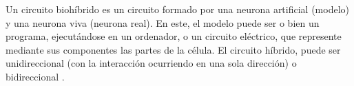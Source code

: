 Un circuito biohíbrido es un circuito formado por una neurona artificial (modelo) y una neurona viva (neurona real). En este, el modelo puede ser o bien un programa, ejecutándose en un ordenador, o un circuito eléctrico, que represente mediante sus componentes las partes de la célula. El circuito híbrido, puede ser unidireccional (con la interacción ocurriendo en una sola dirección) o bidireccional \cite{ReyesSnchez2023}. 
